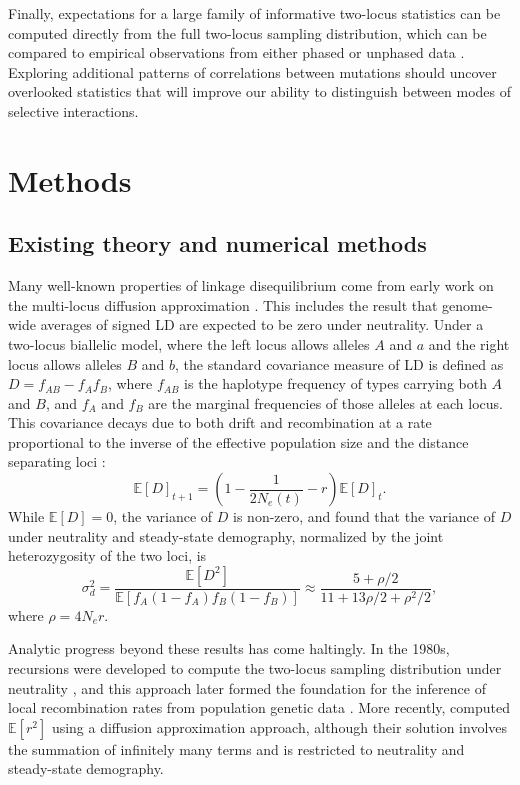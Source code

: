 \documentclass[]{article}
\newcommand{\E}{\mathbb{E}}
\begin{document}
Finally, expectations for a large family of informative two-locus statistics
can be computed directly from the full two-locus sampling distribution, which
can be compared to empirical observations from either phased or unphased data
\citep{Ragsdale2020-nz}. Exploring additional patterns of correlations between
mutations should uncover overlooked statistics that will improve our ability to
distinguish between modes of selective interactions.

\section{Methods}\label{sec:methods}

\subsection{Existing theory and numerical methods}

Many well-known properties of linkage disequilibrium come from
early work on the multi-locus diffusion approximation \citep{Kimura1955-qe,
Hill1968-vu, Ohta1969-ie, Ohta1971-yd}. This includes the result that
genome-wide averages of signed LD are expected to be zero under neutrality.
Under a two-locus biallelic model, where the left locus allows alleles \(A\)
and \(a\) and the right locus allows alleles \(B\) and \(b\), the standard
covariance measure of LD is defined as \(D = f_{AB} - f_{A}f_{B}\), where
\(f_{AB}\) is the haplotype frequency of types carrying both
\(A\) and \(B\), and \(f_{A}\) and \(f_{B}\) are the marginal frequencies of
those alleles at each locus. This covariance decays due to both drift and
recombination at a rate proportional to the inverse of the effective population
size and the distance separating loci \citep{Hill1968-vu}:
\[\E[D]_{t+1} = \left(1 - \frac{1}{2N_e(t)} - r \right)\E[D]_t.\]
While \(\E[D] = 0\), the variance of \(D\) is non-zero, and \citet{Ohta1971-yd}
found that the variance of \(D\) under
neutrality and steady-state demography, normalized by the joint heterozygosity
of the two loci, is
\begin{equation}
    \label{eq:ohta}
    \sigma_d^2 = \frac{\E[D^2]}{\E[f_A(1-f_A)f_B(1-f_B)]}
    \approx\frac{5 + \rho / 2}{11 + 13\rho/ 2 + \rho^2 / 2},
\end{equation}
where \(\rho = 4N_e r\).

Analytic progress beyond these results has come haltingly. In the 1980s,
recursions were developed to compute the two-locus sampling distribution under
neutrality \citep{Golding1984-pu}, and this approach later formed the
foundation for the inference of local recombination rates from population
genetic data \citep{Hudson2001-sg,McVean2004-gj}. More recently,
\citet{Song2007-qk} computed \(\E[r^2]\) using a diffusion approximation
approach, although their solution involves the summation of infinitely many
terms and is restricted to neutrality and steady-state demography.
\end{document}
